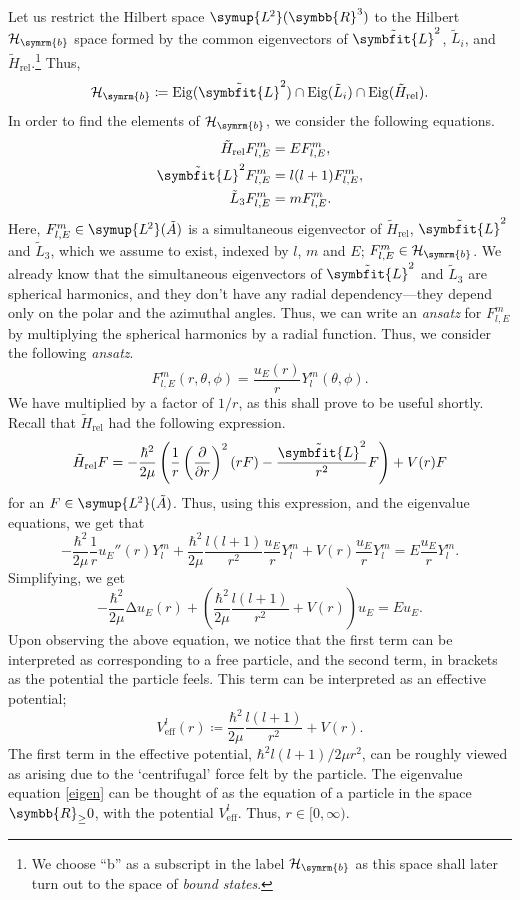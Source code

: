 \documentclass[12pt, a4 paper]{article}
\let\symcal\mathcal
\theoremstyle{definition}
\newcommand{\ltwo}{\symup{L\kern-0.5pt^2}}
\newcommand{\ltworthree}{\ltwo(\rr^3)}
\newcommand{\rr}{\symbb{R}}
\newcommand{\hilbert}{\symcal{H}}
\newcommand{\lap}{∆}
\newcommand{\lvecsquare}{\tilde{\symbfit{L}}^2}
\newcommand{\hrel}{\tilde{H}_\text{rel}}
\newcommand{\lthree}{\tilde{L}_3}
\newcommand{\flme}{F^m_{l,E}}
\newcommand{\bhilbert}{\hilbert_{\symrm{b}}}
\newcommand{\eigen}{\operatorname{Eig}}
\newcommand{\ltwoa}{\ltwo(\tilde{A})}
\newcommand{\sphe}{Y_l^m}
\begin{document}
    Let us restrict the Hilbert space \(\ltworthree\) to the Hilbert \(\bhilbert\) space formed by the common eigenvectors of \(\lvecsquare\), \(\tilde{L}_i\), and \(\hrel\).\footnote{We choose ``b'' as a subscript in the label \(\bhilbert\) as this space shall later turn out to the space of \textit{bound states}.} Thus,
    \[
        \bhilbert \coloneq \eigen(\lvecsquare) \cap \eigen(\tilde{L}_i) \cap \eigen(\hrel).
    \]
    In order to find the elements of \(\bhilbert\), we consider the following equations.
    \begin{align*}
        \hrel \flme &= E \flme,\\
        \lvecsquare \flme &= l(l+1) \flme,\\
        \lthree \flme &= m \flme.
    \end{align*}
    Here, \(\flme \in \ltwoa\) is a simultaneous eigenvector of \(\hrel\), \(\lvecsquare\) and \(\lthree\), which we assume to exist, indexed by \(l\), \(m\) and \(E\); \(\flme \in \bhilbert\). We already know that the simultaneous eigenvectors of \(\lvecsquare\) and \(\lthree\) are spherical harmonics, and they don't have any radial dependency---they depend only on the polar and the azimuthal angles. Thus, we can write an \textit{ansatz} for \(\flme\) by multiplying the spherical harmonics by a radial function. Thus, we consider the following \textit{ansatz}.
    \[
        \flme(r, \theta, \phi) = \frac{u_E(r)}{r}\sphe(\theta, \phi).
    \]
    We have multiplied by a factor of \(1/r\), as this shall prove to be useful shortly. Recall that \(\hrel\) had the following expression.
    \[
        \tilde{H}_\text{rel} F = -\frac{\hbar^2}{2\mu}\left(\frac{1}{r}\left(\frac{\partial}{\partial r}\right)^2 (rF) - \frac{\lvecsquare}{r^2}F\right) + V(r)F
    \]
    for an \(F \in \ltwoa\). Thus, using this expression, and the eigenvalue equations, we get that
    \[
        -\frac{\hbar^2}{2\mu} \frac{1}{r} u_E''(r) \sphe + \frac{\hbar^2}{2\mu} \frac{l(l+1)}{r^2} \frac{u_E}{r} \sphe + V(r) \frac{u_E}{r} \sphe = E \frac{u_E}{r} \sphe.
    \]
    Simplifying, we get
    \[
        -\frac{\hbar^2}{2\mu} \lap u_E(r) + \left(\frac{\hbar^2}{2\mu} \frac{l(l+1)}{r^2} + V(r)\right) u_E = E u_E.\tag{\textasteriskcentered}\label{eigen}
    \]
    Upon observing the above equation, we notice that the first term can be interpreted as corresponding to a free particle, and the second term, in brackets as the potential the particle feels. This term can be interpreted as an effective potential;
    \[
        V^l_{\text{eff}} (r) \coloneq \frac{\hbar^2}{2\mu} \frac{l(l+1)}{r^2} + V(r).
    \]
    The first term in the effective potential, \(\hbar^2 l(l+1)/2\mu r^2\), can be roughly viewed as arising due to the `centrifugal' force felt by the particle. The eigenvalue equation \eqref{eigen} can be thought of as the equation of a particle in the space \(\rr_{\geq}0\), with the potential \(V^l_{\text{eff}}\). Thus, \(r \in [0, \infty)\).
\end{document}
